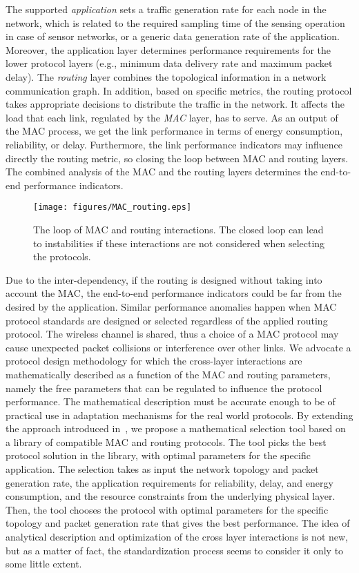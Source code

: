 \documentclass[review, 1p, 11pt]{elsarticle}
\numberwithin{equation}{section}
\begin{document}
The supported \emph{application} sets a traffic generation rate
for each node in the network, which is related to the required
sampling time of the sensing operation in case of sensor networks, or a
generic data generation rate of the application. Moreover, the application
layer determines performance requirements for the lower protocol
layers (e.g., minimum data delivery rate and maximum packet delay). The \emph{routing} layer combines
the topological information in a
network communication graph. In addition, based on specific metrics, the routing
protocol takes appropriate decisions to distribute the traffic in the network. It affects the load that
each link, regulated by the \emph{MAC} layer, has to serve. As an output of the
MAC process, we get the link performance in terms of energy consumption,
reliability, or delay. Furthermore, the link performance indicators
may influence directly the routing metric, so closing the loop
between MAC and routing layers. The combined analysis of the MAC and the routing
layers determines the end-to-end performance indicators.


\begin{figure}\centering
  \texttt{[image: figures/MAC\_routing.eps]}
  \caption{The loop of MAC and routing interactions.
  The closed loop can lead to instabilities if these interactions are not considered when selecting the protocols.}\label{fig:MAC_routing_app_c3}
\end{figure}

Due to the inter-dependency, if the routing is designed without taking into account the
MAC, the end-to-end
performance indicators could be far from the desired by the
application.
Similar performance anomalies happen when MAC protocol standards are designed or
selected regardless of the applied routing protocol. The wireless channel is
shared, thus a choice of a MAC protocol may
cause unexpected packet collisions or interference over
other links.
We advocate a protocol design methodology for which the cross-layer
interactions are mathematically described as a function of the
MAC and routing parameters, namely the free parameters
that can be regulated to influence the protocol performance. The mathematical description must be accurate enough to be of practical use in adaptation mechanisms for the real world protocols.
By extending the approach introduced in~\cite{Sinem09_glo}, we propose
a mathematical selection tool based on a library of compatible
MAC and routing protocols. The tool picks the best
protocol solution in the library, with optimal parameters for the
specific application. The selection takes as input
the network topology and packet generation rate, the application
requirements for reliability, delay, and energy consumption, and
the resource constraints from the underlying physical layer. Then, the
tool chooses the protocol with optimal parameters for the specific topology and packet
generation rate that gives the best performance. The idea of analytical
description and optimization of the cross layer interactions is
not new, but as a matter of fact, the standardization process seems to consider it only to some little extent.
\end{document}
